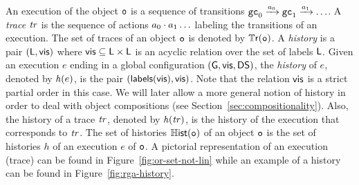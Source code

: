 An execution of the object $\mathtt{o}$ is a sequence of transitions $\mathtt{gc}_0\xrightarrow{a_0}\mathtt{gc}_1\xrightarrow{a_1}\ldots$.
A \emph{trace} $\mathit{tr}$ is the sequence of actions $a_0 \cdot a_1\ldots$ labeling the transitions of an execution.
The set of traces of an object $\mathtt{o}$ is denoted by $\mathbb{T}\mathsf{r}(\mathtt{o})$.
A \emph{history} is a pair $(\mathsf{L},\mathsf{vis})$ where
$\mathsf{vis}\subseteq \mathsf{L}\times\mathsf{L}$ is an acyclic relation over the set of labels $\mathsf{L}$.
Given an execution $e$ ending in a global configuration $(\mathsf{G},
\mathsf{vis}, \mathsf{DS})$, the \emph{history} of $e$, denoted by $\mathit{h}({e)}$, is the pair
$(\mathsf{labels}(\mathsf{vis}), \mathsf{vis})$. Note that the relation $\mathsf{vis}$ is a strict partial order in this case.
We will later allow a more general notion of history in order to deal
with object compositions (see Section~\ref{sec:compositionality}).
Also, the history of a trace $\mathit{tr}$, denoted by $\mathit{h}({\mathit{tr})}$,
is the history of the execution that corresponds to $\mathit{tr}$.
The set of histories $\mathbb{H}\mathsf{ist}(\mathtt{o})$ of an object $\mathtt{o}$ is the
set of histories $h$ of an execution $e$ of $\mathtt{o}$. A pictorial representation
of an execution (trace) can be found in Figure~\ref{fig:or-set-not-lin} while an example of a history
can be found in Figure~\ref{fig:rga-history}.


%

%
%
%
%
%

